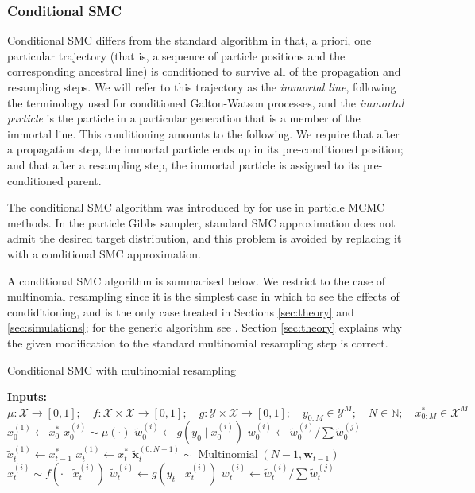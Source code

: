 \documentclass{article}
\begin{document}
\subsubsection{Conditional SMC}
Conditional SMC differs from the standard algorithm in that, a priori, one particular trajectory (that is, a sequence of particle positions and the corresponding ancestral line) is conditioned to survive all of the propagation and resampling steps. We will refer to this trajectory as the \emph{immortal line}, following the terminology used for conditioned Galton-Watson processes, and the \emph{immortal particle} is the particle in a particular generation that is a member of the immortal line.
This conditioning amounts to the following. We require that after a propagation step, the immortal particle ends up in its pre-conditioned position; and that after a resampling step, the immortal particle is assigned to its pre-conditioned parent.

The conditional SMC algorithm was introduced by \citet{andrieu2010} for use in particle MCMC methods. In the particle Gibbs sampler, standard SMC approximation does not admit the desired target distribution, and this problem is avoided by replacing it with a conditional SMC approximation.

A conditional SMC algorithm is summarised below. We restrict to the case of multinomial resampling since it is the simplest case in which to see the effects of condiditioning, and is the only case treated in Sections \ref{sec:theory} and \ref{sec:simulations}; for the generic algorithm see \citet[Section 4.3]{andrieu2010}. Section \ref{sec:theory} explains why the given modification to the standard multinomial resampling step is correct.
\begin{algorithm}
	\caption{Conditional SMC with multinomial resampling}\label{alg:condSMC}
	\begin{algorithmic}[0]
    	\State \textbf{Inputs:} $\mu:\mathcal{X}\to[0,1];\quad f:\mathcal{X}\times\mathcal{X}\to[0,1];\quad g:\mathcal{Y}\times\mathcal{X}\to[0,1];\quad y_{0:M}\in\mathcal{Y}^M;\quad N\in\mathbb{N}; \quad x_{0:M}^* \in \mathcal{X}^M$
    	\State $x_0^{(1)} \gets x_0^*$
			\State $x_0^{(i)} \sim \mu(\cdot)$
		\EndFor
			\State $\tilde{w}_0^{(i)} \gets g(y_0 \mid x_0^{(i)})$
			\State $w_0^{(i)} \gets \tilde{w}_0^{(i)} / \sum \tilde{w}_0^{(j)}$
		\EndFor
			\State $\tilde{x}_t^{(1)} \gets x_{t-1}^*$
			\State $x_t^{(1)} \gets x_t^*$
			\State $\tilde{\mathbf{x}}_t^{(0:N-1)} \sim \operatorname{Multinomial}(N-1, \mathbf{w}_{t-1})$
				\State $x_t^{(i)} \sim f(\cdot \mid \tilde{x}_t^{(i)})$
			\EndFor
				\State $\tilde{w}_t^{(i)} \gets g(y_t \mid x_t^{(i)})$
				\State $w_t^{(i)} \gets \tilde{w}_t^{(i)} / \sum \tilde{w}_t^{(j)}$
        	\EndFor
        \EndFor
	\end{algorithmic}
\end{algorithm}
\end{document}
